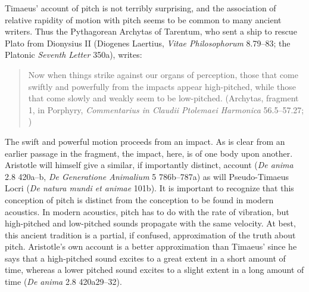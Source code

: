 Timaeus' account of pitch is not terribly surprising, and the association of relative rapidity of motion with pitch seems to be common to many ancient writers. Thus the Pythagorean Archytas of Tarentum, who sent a ship to rescue Plato from Dionysius II (Diogenes Laertius, \emph{Vitae Philosophorum} 8.79--83; the Platonic \emph{Seventh Letter} 350a), writes:
\begin{quote}
	Now when things strike against our organs of perception, those that come swiftly and powerfully from the impacts appear high-pitched, while those that come slowly and weakly seem to be low-pitched. (Archytas, fragment 1, in Porphyry, \emph{Commentarius in Claudii Ptolemaei Harmonica} 56.5--57.27; \citealt[41]{Barker:1989pi})
\end{quote}
The swift and powerful motion proceeds from an impact. As is clear from an earlier passage in the fragment, the impact, here, is of one body upon another. Aristotle will himself give a similar, if importantly distinct, account (\emph{De anima} 2.8 420a--b, \emph{De Generatione Animalium} 5 786b--787a) as will Pseudo-Timaeus Locri (\emph{De natura mundi et animae} 101b). It is important to recognize that this conception of pitch is distinct from the conception to be found in modern acoustics. In modern acoustics, pitch has to do with the rate of vibration, but high-pitched and low-pitched sounds propagate with the same velocity. At best, this ancient tradition is a partial, if confused, approximation of the truth about pitch. Aristotle's own account is a better approximation than Timaeus' since he says that a high-pitched sound excites to a great extent in a short amount of time, whereas a lower pitched sound excites to a slight extent in a long amount of time (\emph{De anima} 2.8 420a29--32).

